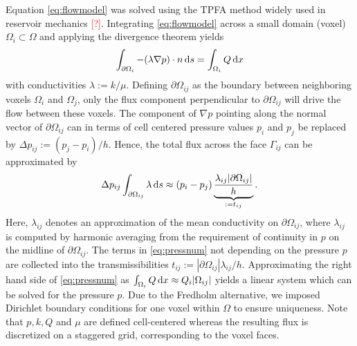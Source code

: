 \documentclass[paper=a4, fontsize=11pt,parskip=half,headings=small]{scrartcl}
\newcommand{\missingsource}{\textcolor{red}{[?]}}
\begin{document}
	Equation \eqref{eq:flowmodel} was solved using the TPFA method widely used in reservoir mechanics \missingsource.
	Integrating \eqref{eq:flowmodel} across a small domain (voxel) $\Omega_i \subset \Omega$ and applying the divergence theorem yields
	\begin{equation}
		\int_{\partial \Omega_i}   -(\lambda \nabla p) \cdot n \,\mathrm{d} s = \int_{\Omega_i}Q \,\mathrm{d} x
	\label{eq:TPFAint}
	\end{equation}
	with conductivities $\lambda := k/\mu$.
	Defining $\partial \Omega_{ij}$ as the boundary between neighboring voxels $\Omega_i$ and $\Omega_j$, only the flux component perpendicular to $\partial \Omega_{ij}$ will drive the flow between these voxels.
	The component of $\nabla p$ pointing along the normal vector of $\partial \Omega_{ij}$ can in terms of cell centered pressure values $p_i$ and $p_j$ be replaced by
 	$\Delta p_{ij} := (p_j - p_i)/h$.
	Hence, the total flux across the face $\Gamma_{ij}$ can be approximated by
	\begin{equation}
		\Delta p_{ij} \int_{\partial \Omega_{ij}}\lambda \,\mathrm{d} s \approx (p_i - p_j) \underbrace{\frac{\lambda_{ij} \vert \partial \Omega_{ij} \vert}{h}}_{:=t_{ij}}.
		\label{eq:pressnum}
	\end{equation}
	Here, $\lambda_{ij}$ denotes an approximation of the mean conductivity on $\partial \Omega_{ij}$, where $\lambda_{ij}$ is computed by harmonic averaging from the requirement of continuity in $p$ on the midline of $\partial \Omega_{ij}$.
	The terms in \eqref{eq:pressnum} not depending on the pressure $p$ are collected into the transmissibilities $t_{ij}:=|\partial \Omega_{ij}|\lambda_{ij}/h$.
	Approximating the right hand side of \eqref{eq:pressnum} as $\int_{\Omega_i}Q \,\mathrm{d} x \approx Q_i |\Omega_{ij}|$ yields a linear system which can be solved for the pressure $p$. Due to the Fredholm alternative, we imposed Dirichlet boundary conditions for one voxel within $\Omega$ to ensure uniqueness.
	Note that $p,k,Q$ and $\mu$ are defined cell-centered whereas the resulting flux is discretized on a staggered grid, corresponding to the voxel faces.


\end{document}
